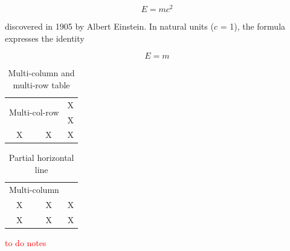\documentclass{article}
\newcommand\myworries[1]{\textcolor{red}{#1}}
\begin{document}
\[E=mc^2\]

discovered in 1905 by Albert Einstein. 
In natural units ($c$ = 1), the formula expresses the identity

\begin{equation}
E=m
\end{equation}



\begin{table}[ht]
\caption{Multi-column and multi-row table}
\begin{center}
\begin{tabular}{ccc}
    \hline
    \multicolumn{2}{c}{\multirow{2}{*}{Multi-col-row}}&X\\
    \multicolumn{2}{c}{}&X\\
    \hline
    X&X&X\\
    \hline
\end{tabular}
\end{center}
\label{tab:multicol}
\end{table}

\begin{table}[ht]
\caption{Partial horizontal line}
\begin{center}
\begin{tabular}{ccc}
    \hline
    \multicolumn{2}{c}{Multi-column}&\\
    \cline{1-2}
    X&X&X\\
    X&X&X\\
    \hline
\end{tabular}
\end{center}
\label{tab:multicol}
\end{table}


\myworries{to do notes}
       
\end{document}
